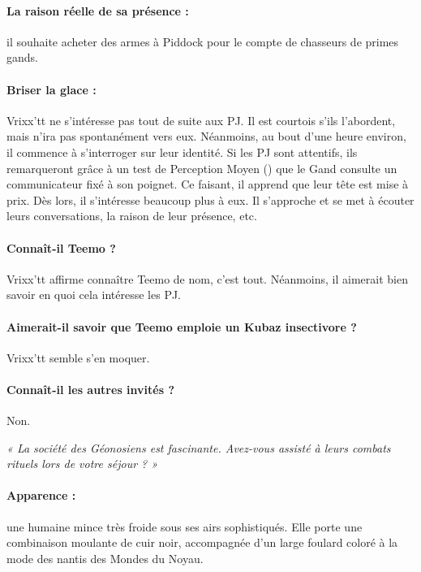 \documentclass[a4paper,10pt,twoside,twocolumn,openany]{book}
\begin{document}
\paragraph{La raison réelle de sa présence :} il souhaite acheter
des armes à Piddock pour le compte de chasseurs de
primes gands.

\paragraph{Briser la glace :}Vrixx’tt ne s’intéresse pas tout de suite
aux PJ. Il est courtois s’ils l’abordent, mais n’ira pas spontanément vers eux. Néanmoins, au bout d’une heure environ, il commence à s’interroger sur leur identité. Si les
PJ sont attentifs, ils remarqueront grâce à un test de
Perception Moyen (\difficulty \difficulty) que le Gand consulte un communicateur fixé à son poignet. Ce faisant, il apprend que
leur tête est mise à prix. Dès lors, il s’intéresse beaucoup plus à eux. Il s’approche et se met à écouter leurs
conversations, la raison de leur présence, etc.

\paragraph{Connaît-il Teemo ?} Vrixx’tt affirme connaître Teemo de
nom, c’est tout. Néanmoins, il aimerait bien savoir en
quoi cela intéresse les PJ.

\paragraph{Aimerait-il savoir que Teemo emploie un Kubaz insectivore ?} Vrixx’tt semble s’en moquer.

\paragraph{Connaît-il les autres invités ?} Non.


\subtitle{MARU JAKKAR}
\emph{« La société des Géonosiens est fascinante. Avez-vous
assisté à leurs combats rituels lors de votre séjour ? »}

\paragraph{Apparence :} une humaine mince très froide sous ses
airs sophistiqués. Elle porte une combinaison moulante
de cuir noir, accompagnée d’un large foulard coloré à la
mode des nantis des Mondes du Noyau.
\end{document}
